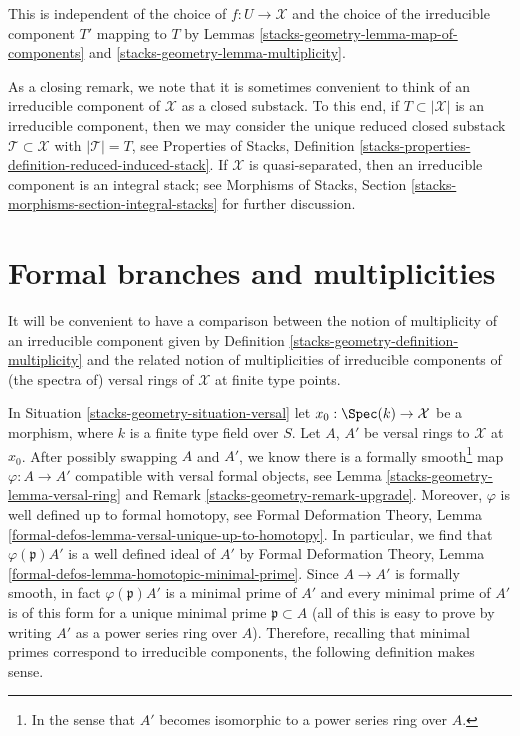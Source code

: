 This is independent of the choice of $f : U \to \mathcal{X}$
and the choice of the irreducible component $T'$ mapping to $T$
by Lemmas \ref{stacks-geometry-lemma-map-of-components} and \ref{stacks-geometry-lemma-multiplicity}.

\medskip\noindent
As a closing remark, we note that it is sometimes convenient to think
of an irreducible component of $\mathcal{X}$ as a closed substack.
To this end, if $T \subset |\mathcal{X}|$ is an irreducible component,
then we may consider the unique reduced closed substack
$\mathcal{T} \subset \mathcal{X}$ with $|\mathcal{T}| = T$, see
Properties of Stacks, Definition
\ref{stacks-properties-definition-reduced-induced-stack}.
If $\mathcal{X}$ is quasi-separated, then
an irreducible component is an integral stack; see
Morphisms of Stacks, Section \ref{stacks-morphisms-section-integral-stacks}
for further discussion.

\section{Formal branches and multiplicities}
\label{stacks-geometry-section-formal-branches}
It will be convenient to have a comparison between the notion of multiplicity
of an irreducible component given by Definition \ref{stacks-geometry-definition-multiplicity}
and the related notion of multiplicities of irreducible components of
(the spectra of) versal rings of $\mathcal{X}$ at finite type points.

\medskip\noindent
In Situation \ref{stacks-geometry-situation-versal} let $x_0 : \Spec(k) \to \mathcal{X}$
be a morphism, where $k$ is a finite type field over $S$.
Let $A$, $A'$ be versal rings to $\mathcal{X}$ at $x_0$.
After possibly swapping $A$ and $A'$, we know there is a
formally smooth\footnote{In the sense that
$A'$ becomes isomorphic to a power series ring over $A$.}
map $\varphi : A \to A'$ compatible with versal formal objects, see
Lemma \ref{stacks-geometry-lemma-versal-ring} and
Remark \ref{stacks-geometry-remark-upgrade}.
Moreover, $\varphi$ is well defined up to formal homotopy, see
Formal Deformation Theory, Lemma
\ref{formal-defos-lemma-versal-unique-up-to-homotopy}.
In particular, we find that $\varphi(\mathfrak p)A'$ is a well
defined ideal of $A'$ by
Formal Deformation Theory, Lemma
\ref{formal-defos-lemma-homotopic-minimal-prime}.
Since $A \to A'$ is formally smooth, in fact
$\varphi(\mathfrak p)A'$ is a minimal prime of $A'$
and every minimal prime of $A'$ is of this form for
a unique minimal prime $\mathfrak p \subset A$ (all of this
is easy to prove by writing $A'$ as a power series ring over $A$).
Therefore, recalling that minimal primes correspond
to irreducible components, the following definition makes sense.

